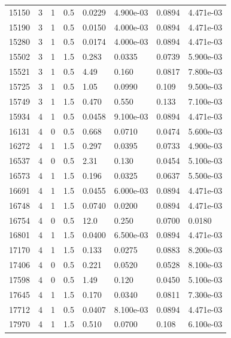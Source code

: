 \documentclass[preview]{standalone}
\begin{document}
{{{{\begin{tabular}{L{1.2cm}C{1.2cm} C{0.3cm}C{0.5cm} C{1.4cm}C{1.4cm} C{1.4cm}C{1.4cm}}
  15150  &     3  & 1     & 0.5 &  0.0229  & 4.900e-03  & 0.0894 &  4.471e-03   \\ 
  15190  &     3  & 1     & 0.5 &  0.0150  & 4.000e-03  & 0.0894 &  4.471e-03   \\ 
  15280  &     3  & 1     & 0.5 &  0.0174  & 4.000e-03  & 0.0894 &  4.471e-03   \\ 
  15502  &     3  & 1     & 1.5 &  0.283  & 0.0335  & 0.0739 &  5.900e-03   \\ 
  15521  &     3  & 1     & 0.5 &  4.49  & 0.160  & 0.0817 &  7.800e-03   \\ 
  15725  &     3  & 1     & 0.5 &  1.05  & 0.0990  & 0.109 &  9.500e-03   \\ 
  15749  &     3  & 1     & 1.5 &  0.470  & 0.550  & 0.133 &  7.100e-03   \\ 
  15934  &     4  & 1     & 0.5 &  0.0458  & 9.100e-03  & 0.0894 &  4.471e-03   \\ 
  16131  &     4  & 0     & 0.5 &  0.668  & 0.0710  & 0.0474 &  5.600e-03   \\ 
  16272  &     4  & 1     & 1.5 &  0.297  & 0.0395  & 0.0733 &  4.900e-03   \\ 
  16537  &     4  & 0     & 0.5 &  2.31  & 0.130  & 0.0454 &  5.100e-03   \\ 
  16573  &     4  & 1     & 1.5 &  0.196  & 0.0325  & 0.0637 &  5.500e-03   \\ 
  16691  &     4  & 1     & 1.5 &  0.0455  & 6.000e-03  & 0.0894 &  4.471e-03   \\ 
  16748  &     4  & 1     & 1.5 &  0.0740  & 0.0200  & 0.0894 &  4.471e-03   \\ 
  16754  &     4  & 0     & 0.5 &  12.0  & 0.250  & 0.0700 &  0.0180   \\ 
  16801  &     4  & 1     & 1.5 &  0.0400  & 6.500e-03  & 0.0894 &  4.471e-03   \\ 
  17170  &     4  & 1     & 1.5 &  0.133  & 0.0275  & 0.0883 &  8.200e-03   \\ 
  17406  &     4  & 0     & 0.5 &  0.221  & 0.0520  & 0.0528 &  8.100e-03   \\ 
  17598  &     4  & 0     & 0.5 &  1.49  & 0.120  & 0.0450 &  5.100e-03   \\ 
  17645  &     4  & 1     & 1.5 &  0.170  & 0.0340  & 0.0811 &  7.300e-03   \\ 
  17712  &     4  & 1     & 0.5 &  0.0407  & 8.100e-03  & 0.0894 &  4.471e-03   \\ 
  17970  &     4  & 1     & 1.5 &  0.510  & 0.0700  & 0.108 &  6.100e-03   \\ 

\end{tabular}}}}}
\end{document}
